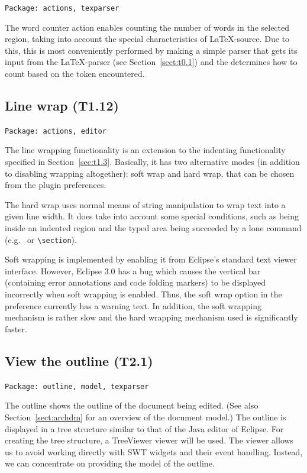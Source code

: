 \documentclass[a4paper,11pt,twoside]{article}
\begin{document}
\texttt{Package: actions, texparser}

The word counter action enables counting the number of words in the
selected region, taking into account the special characteristics of
\LaTeX -source. Due to this, this is most conveniently performed by
making a simple parser that gets its input from the \LaTeX -parser
(see Section~\ref{sect:t0.1}) and the determines how to count based on
the token encountered.

\subsection{Line wrap (T1.12)}

\texttt{Package: actions, editor}

The line wrapping functionality is an extension to the indenting functionality
specified in Section~\ref{sec:t1.3}. Basically, it has two alternative modes (in
addition to disabling wrapping altogether): soft wrap and hard wrap, that can be
chosen from the plugin preferences.

The hard wrap uses normal means of string manipulation to wrap text into a given
line width. It does take into account some special conditions, such as being
inside an indented region and the typed area being succeeded by a lone command
(e.g.\ \verb++ or \verb+\section+).

Soft wrapping is implemented by enabling it from Eclipse's standard text viewer
interface. However, Eclipse 3.0 has a bug which causes the vertical bar
(containing error annotations and code folding markers) to be displayed
incorrectly when soft wrapping is enabled. Thus, the soft wrap option in the
preference currently has a warning text. In addition, the soft wrapping
mechanism is rather slow and the hard wrapping mechanism used is significantly
faster.


\subsection{View the outline (T2.1)}
\label{sect:t2.1}

\texttt{Package: outline, model, texparser}

The outline shows the outline of the document being edited. (See also 
Section~\ref{sect:archdm} for an overview of the document model.) The outline is 
displayed in a tree structure similar to that of the Java editor of Eclipse. 
For creating the tree structure, a TreeViewer viewer will be used. The viewer 
allows us to avoid working directly with SWT widgets and their event handling. 
Instead, we can concentrate on providing the model of the outline.
\end{document}
